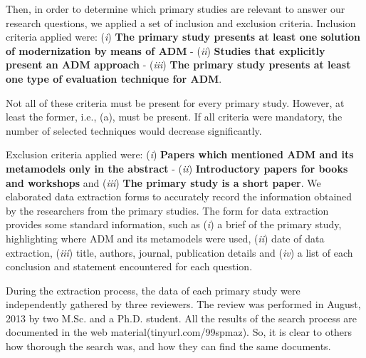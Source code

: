 Then, in order to determine which primary studies are relevant to answer our research questions, we applied a set of inclusion and exclusion criteria. Inclusion criteria applied were: (\textit{i}) \textbf{The primary study presents at least one solution of modernization by means of ADM} - (\textit{ii}) \textbf{Studies that explicitly present an ADM approach} - (\textit{iii}) \textbf{The primary study presents at least one type of evaluation technique for ADM}. 



Not all of these criteria must be present for every primary study. However, at least the former, i.e., (a), must be present. If all criteria were mandatory, the number of selected techniques would decrease significantly.

Exclusion criteria applied were: (\textit{i}) \textbf{Papers which mentioned ADM and its metamodels only in the abstract} - (\textit{ii}) \textbf{Introductory papers for books and workshops} and (\textit{iii}) \textbf{The primary study is a short paper}. We elaborated data extraction forms to accurately record the information obtained by the researchers from the primary studies. The form for data extraction provides some standard information, such as (\textit{i}) a brief of the primary study, highlighting where ADM and its metamodels were used, (\textit{ii}) date of data extraction, (\textit{iii}) title, authors, journal, publication details and (\textit{iv}) a list of each conclusion and statement encountered for each question. 

During the extraction process, the data of each primary study were independently gathered by three reviewers. The review was performed in August, 2013 by two M.Sc. and a Ph.D. student. All the results of the search process are documented in the web material(tinyurl.com/99spmaz). So, it is clear to others how thorough the search was, and how they can find the same documents.
